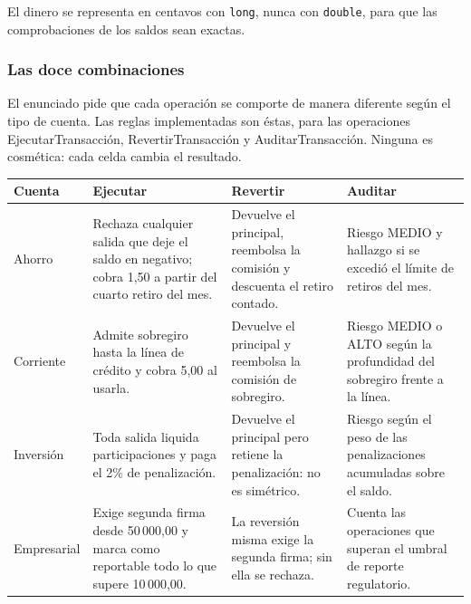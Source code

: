 El dinero se representa en centavos con \texttt{long}, nunca con \texttt{double}, para que las
comprobaciones de los saldos sean exactas.

\subsubsection*{Las doce combinaciones}

El enunciado pide que cada operación se comporte de manera diferente según el tipo de cuenta.
Las reglas implementadas son éstas, para las operaciones EjecutarTransacción,
RevertirTransacción y AuditarTransacción. Ninguna es cosmética: cada celda cambia el
resultado.

\begin{table}[h!]
    \centering
    \small
    \begin{tabular}{p{2.1cm}p{3.55cm}p{3.55cm}p{3.55cm}}
        \toprule
        \textbf{Cuenta} & \textbf{Ejecutar} & \textbf{Revertir} & \textbf{Auditar} \\
        \midrule
        Ahorro & Rechaza cualquier salida que deje el saldo en negativo; cobra 1,50 a partir
                 del cuarto retiro del mes.
               & Devuelve el principal, reembolsa la comisión y descuenta el retiro contado.
               & Riesgo MEDIO y hallazgo si se excedió el límite de retiros del mes. \\
        \addlinespace
        Corriente & Admite sobregiro hasta la línea de crédito y cobra 5,00 al usarla.
                  & Devuelve el principal y reembolsa la comisión de sobregiro.
                  & Riesgo MEDIO o ALTO según la profundidad del sobregiro frente a la línea. \\
        \addlinespace
        Inversión & Toda salida liquida participaciones y paga el 2\% de penalización.
                  & Devuelve el principal pero retiene la penalización: no es simétrico.
                  & Riesgo según el peso de las penalizaciones acumuladas sobre el saldo. \\
        \addlinespace
        Empresarial & Exige segunda firma desde 50\,000,00 y marca como reportable todo lo que
                      supere 10\,000,00.
                    & La reversión misma exige la segunda firma; sin ella se rechaza.
                    & Cuenta las operaciones que superan el umbral de reporte regulatorio. \\
        \bottomrule
    \end{tabular}
\end{table}

